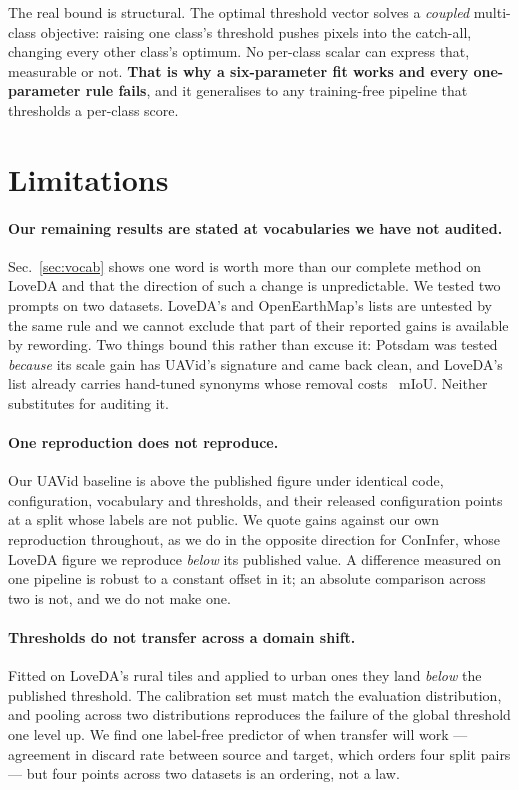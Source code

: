 \documentclass[10pt,twocolumn,letterpaper]{article}          %
\newcommand{\best}[1]{\textbf{#1}}
\begin{document}
The real bound is structural. The optimal threshold vector solves a \emph{coupled}
multi-class objective: raising one class's threshold pushes pixels into the catch-all,
changing every other class's optimum. No per-class scalar can express that, measurable
or not. \best{That is why a six-parameter fit works and every one-parameter rule
fails}, and it generalises to any training-free pipeline that thresholds a per-class
score.

\section{Limitations}
\label{sec:limitations}

\paragraph{\best{Our remaining results are stated at vocabularies we have not
audited.}} Sec.~\ref{sec:vocab} shows one word is worth more than our complete method
on LoveDA and that the direction of such a change is unpredictable. We tested two
prompts on two datasets. LoveDA's and OpenEarthMap's lists are untested by the same
rule and we cannot exclude that part of their reported gains is available by
rewording. Two things bound this rather than excuse it: Potsdam was tested
\emph{because} its scale gain has UAVid's signature and came back clean, and LoveDA's
list already carries hand-tuned synonyms whose removal costs \vocLoveBarren{}~mIoU.
Neither substitutes for auditing it.

\paragraph{One reproduction does not reproduce.} Our UAVid baseline is \uavGap{} above
the published figure under identical code, configuration, vocabulary and thresholds,
and their released configuration points at a split whose labels are not public. We
quote gains against our own reproduction throughout, as we do in the opposite
direction for ConInfer, whose LoveDA figure we reproduce \cnGap{} \emph{below} its
published value. A difference measured on one pipeline is robust to a constant offset
in it; an absolute comparison across two is not, and we do not make one.

\paragraph{Thresholds do not transfer across a domain shift.} Fitted on LoveDA's rural
tiles and applied to urban ones they land \emph{below} the published threshold. The
calibration set must match the evaluation distribution, and pooling across two
distributions reproduces the failure of the global threshold one level up. We find one
label-free predictor of when transfer will work --- agreement in discard rate between
source and target, which orders four split pairs --- but four points across two
datasets is an ordering, not a law.
\end{document}
